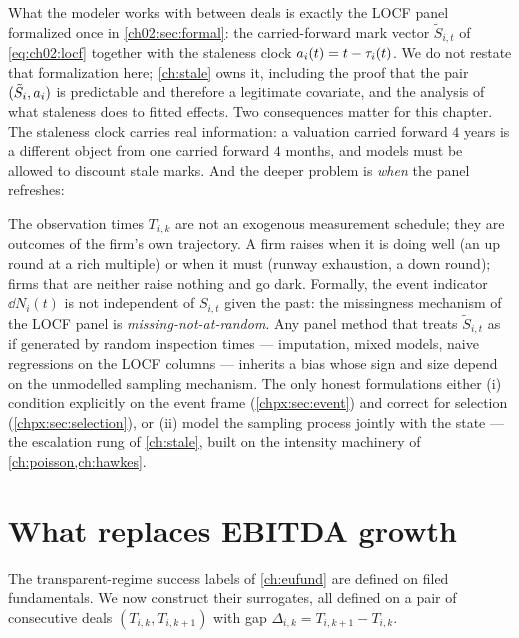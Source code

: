 What the modeler works with between deals is exactly the LOCF panel formalized once in
\cref{ch02:sec:formal}: the carried-forward mark vector $\tilde S_{i,t}$ of \cref{eq:ch02:locf}
together with the staleness clock $a_i(t) = t - \tau_i(t)$. We do not restate that
formalization here; \cref{ch:stale} owns it, including the proof that the pair $(\tilde S_i,
a_i)$ is predictable and therefore a legitimate covariate, and the analysis of what
staleness does to fitted effects. Two consequences matter for this chapter. The staleness clock
carries real information: a valuation carried forward $4$ years is a different object from one
carried forward $4$ months, and models must be allowed to discount stale marks. And the deeper
problem is \emph{when} the panel refreshes:

\begin{warning}\label{warn:us-mnar}
The observation times $T_{i,k}$ are not an exogenous measurement schedule; they are outcomes of
the firm's own trajectory. A firm raises when it is doing well (an up round at a rich multiple)
or when it must (runway exhaustion, a down round); firms that are neither raise nothing and go
dark. Formally, the event indicator $\dd N_i(t)$ is not independent of $S_{i,t}$ given the past:
the missingness mechanism of the LOCF panel is \emph{missing-not-at-random}. Any panel method
that treats $\tilde{S}_{i,t}$ as if generated by random inspection times --- imputation, mixed
models, naive regressions on the LOCF columns --- inherits a bias whose sign and size depend on
the unmodelled sampling mechanism. The only honest formulations either (i) condition explicitly
on the event frame (\cref{chpx:sec:event}) and correct for selection
(\cref{chpx:sec:selection}), or (ii) model the sampling process jointly with the state
\citep{rizopoulos2012,tsiatisdavidian2004} --- the escalation rung of \cref{ch:stale}, built on
the intensity machinery of \cref{ch:poisson,ch:hawkes}.
\end{warning}

\section{What replaces EBITDA growth}\label{chpx:sec:proxies}

The transparent-regime success labels of \cref{ch:eufund} are defined on filed fundamentals. We
now construct their surrogates, all defined on a pair of consecutive deals $(T_{i,k},
T_{i,k+1})$ with gap $\Delta_{i,k} = T_{i,k+1} - T_{i,k}$.

